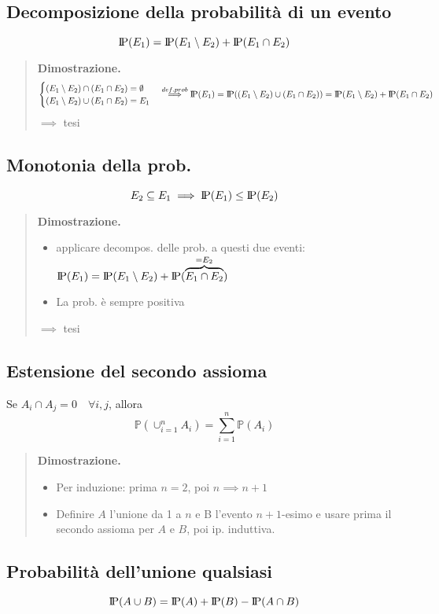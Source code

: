 \documentclass[a4paper,10pt]{article}
\newcommand{\pr}{\text{I\kern-0.15em P}} %
\theoremstyle{remark}
\theoremstyle{definition}
\newenvironment{dimo}{\begin{quote}\textbf{Dimostrazione.}}{\end{quote}} %
\begin{document}
\subsection{Decomposizione della probabilità di un evento}
$$\pr(E_1)=\pr(E_1\setminus E_2)+\pr(E_1\cap E_2)$$

\begin{dimo}
    $$
    \begin{cases}
        (E_1\setminus E_2)\cap (E_1 \cap E_2) = \emptyset\\
        (E_1\setminus E_2) \cup (E_1\cap E_2) = E_1
    \end{cases}
    \overset{def.prob}{\implies} \pr(E_1)= \pr((E_1\setminus E_2)\cup (E_1\cap E_2))= \pr(E_1\setminus E_2) + \pr(E_1\cap E_2)
 $$
 $\implies$ tesi
\end{dimo}

\subsection{Monotonia della prob.}
$$E_2\subseteq E_1 \implies \pr(E_1) \le \pr(E_2)$$

\begin{dimo}
    \begin{itemize}
        \item applicare decompos. delle prob. a questi due eventi: $\pr(E_1)=\pr(E_1\setminus E_2) + \pr(\overbrace{E_1\cap E_2}^{=E_2})$
        \item La prob. è sempre positiva
    \end{itemize}
    $\implies$ tesi
\end{dimo}

\subsection{Estensione del secondo assioma}
Se $A_i \cap A_j =0 \quad \forall i,j$, allora
$$\mathbb{P}(\cup_{i=1}^n A_i)=\sum_{i=1}^n \mathbb{P}(A_i)$$
\begin{dimo}
    \begin{itemize}
        \item Per induzione: prima $n=2$, poi $n \implies n+1$
        \item Definire $A$ l'unione da 1 a $n$ e B l'evento $n+1$-esimo e usare prima il secondo assioma per $A$ e $B$, poi ip. induttiva.
    \end{itemize}
\end{dimo}

\subsection{Probabilità dell'unione qualsiasi}
$$\pr(A \cup B) = \pr (A)+\pr(B) -\pr(A\cap B)$$
\end{document}
